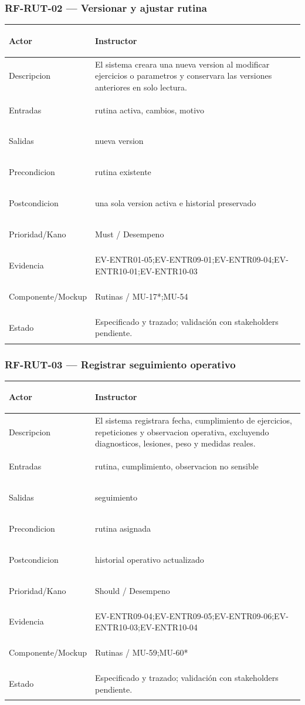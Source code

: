 \documentclass[11pt,a4paper,twoside]{article}
\begin{document}
\subsubsection{RF-RUT-02 — Versionar y ajustar rutina}
\begingroup
\renewcommand{\arraystretch}{1.12}
\setlength{\tabcolsep}{5pt}
\begin{tabularx}{\textwidth}{|>{\bfseries\raggedright\arraybackslash}p{3.35cm}|>{\raggedright\arraybackslash}X|}
\hline
Actor & Instructor \\ \hline
Descripcion & El sistema creara una nueva version al modificar ejercicios o parametros y conservara las versiones anteriores en solo lectura. \\ \hline
Entradas & rutina activa, cambios, motivo \\ \hline
Salidas & nueva version \\ \hline
Precondicion & rutina existente \\ \hline
Postcondicion & una sola version activa e historial preservado \\ \hline
Prioridad/Kano & Must / Desempeno \\ \hline
Evidencia & EV-ENTR01-05;EV-ENTR09-01;EV-ENTR09-04;EV-ENTR10-01;EV-ENTR10-03 \\ \hline
Componente/Mockup & Rutinas / MU-17*;MU-54 \\ \hline
Estado & Especificado y trazado; validación con stakeholders pendiente. \\ \hline
\end{tabularx}
\endgroup

\subsubsection{RF-RUT-03 — Registrar seguimiento operativo}
\begingroup
\renewcommand{\arraystretch}{1.12}
\setlength{\tabcolsep}{5pt}
\begin{tabularx}{\textwidth}{|>{\bfseries\raggedright\arraybackslash}p{3.35cm}|>{\raggedright\arraybackslash}X|}
\hline
Actor & Instructor \\ \hline
Descripcion & El sistema registrara fecha, cumplimiento de ejercicios, repeticiones y observacion operativa, excluyendo diagnosticos, lesiones, peso y medidas reales. \\ \hline
Entradas & rutina, cumplimiento, observacion no sensible \\ \hline
Salidas & seguimiento \\ \hline
Precondicion & rutina asignada \\ \hline
Postcondicion & historial operativo actualizado \\ \hline
Prioridad/Kano & Should / Desempeno \\ \hline
Evidencia & EV-ENTR09-04;EV-ENTR09-05;EV-ENTR09-06;EV-ENTR10-03;EV-ENTR10-04 \\ \hline
Componente/Mockup & Rutinas / MU-59;MU-60* \\ \hline
Estado & Especificado y trazado; validación con stakeholders pendiente. \\ \hline
\end{tabularx}
\endgroup
\end{document}
